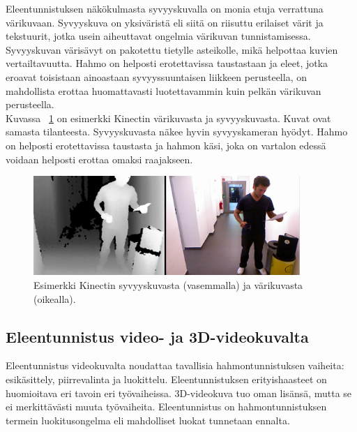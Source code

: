 Eleentunnistuksen näkökulmasta syvyyskuvalla on monia etuja verrattuna värikuvaan. Syvyyskuva on yksiväristä
eli siitä on riisuttu erilaiset värit ja tekstuurit, jotka usein aiheuttavat ongelmia värikuvan tunnistamisessa.
Syvyyskuvan värisävyt on pakotettu tietylle asteikolle, mikä helpottaa kuvien vertailtavuutta. \citep{5995316} Hahmo on helposti erotettavissa
taustastaan ja eleet, jotka eroavat toisistaan ainoastaan syvyyssuuntaisen liikkeen perusteella, 
on mahdollista erottaa huomattavasti luotettavammin kuin pelkän värikuvan perusteella.\\
 
Kuvassa ~\ref{fig:kinectkuva} on esimerkki Kinectin värikuvasta ja syvyyskuvasta. Kuvat ovat samasta tilanteesta.
Syvyyskuvasta näkee hyvin syvyyskameran hyödyt. Hahmo on helposti erotettavissa taustasta ja hahmon käsi, 
joka on vartalon edessä voidaan helposti erottaa omaksi raajakseen. \\

\begin{figure}[htb]
  \begin{center}
    \includegraphics[width=0.9\textwidth]{kinect1_cropped-1024x382.png}
    \caption{Esimerkki Kinectin syvyyskuvasta (vasemmalla) ja värikuvasta (oikealla). \citep {kinectkuva}}
    \label{fig:kinectkuva}
  \end{center}
\end{figure}

\subsection{Eleentunnistus video- ja 3D-videokuvalta}

Eleentunnistus videokuvalta noudattaa tavallisia hahmontunnistuksen vaiheita: esikäsittely, piirrevalinta ja
luokittelu. Eleentunnistuksen erityishaasteet on huomioitava eri tavoin eri työvaiheissa. 3D-videokuva tuo 
oman lisänsä, mutta se ei merkittävästi muuta työvaiheita. Eleentunnistus on hahmontunnistuksen termein
luokitusongelma eli mahdolliset luokat tunnetaan ennalta. \citep{6239178}  \\

